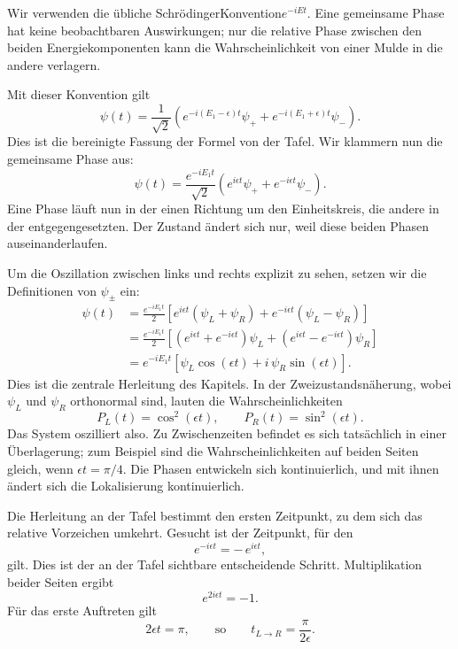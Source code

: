 Wir verwenden die übliche Schr\"odingerKonvention\(e^{-iEt}\). Eine gemeinsame Phase hat keine beobachtbaren Auswirkungen; nur die relative Phase zwischen den beiden Energiekomponenten kann die Wahrscheinlichkeit von einer Mulde in die andere verlagern.

Mit dieser Konvention gilt
\begin{equation}
\psi(t)=\frac{1}{\sqrt{2}}\left(e^{-i(E_1-\epsilon)t}\psi_+ + e^{-i(E_1+\epsilon)t}\psi_-\right).
\end{equation}
Dies ist die bereinigte Fassung der Formel von der Tafel. Wir klammern nun die gemeinsame Phase aus:
\begin{equation}
\psi(t)=\frac{e^{-iE_1 t}}{\sqrt{2}}\left(e^{i\epsilon t}\psi_+ + e^{-i\epsilon t}\psi_-\right).
\end{equation}
Eine Phase läuft nun in der einen Richtung um den Einheitskreis, die andere in der entgegengesetzten. Der Zustand ändert sich nur, weil diese beiden Phasen auseinanderlaufen.

Um die Oszillation zwischen links und rechts explizit zu sehen, setzen wir die Definitionen von \(\psi_\pm\) ein:
\begin{align}
\psi(t)
&= \frac{e^{-iE_1 t}}{2}
\left[e^{i\epsilon t}(\psi_L+\psi_R)+e^{-i\epsilon t}(\psi_L-\psi_R)\right] \\
&= \frac{e^{-iE_1 t}}{2}
\left[(e^{i\epsilon t}+e^{-i\epsilon t})\psi_L+(e^{i\epsilon t}-e^{-i\epsilon t})\psi_R\right] \\
&= e^{-iE_1 t}\left[\psi_L\cos(\epsilon t)+i\,\psi_R\sin(\epsilon t)\right].
\end{align}
Dies ist die zentrale Herleitung des Kapitels. In der Zweizustandsnäherung, wobei \(\psi_L\) und \(\psi_R\) orthonormal sind, lauten die Wahrscheinlichkeiten
\begin{equation}
P_L(t)=\cos^2(\epsilon t),
\qquad
P_R(t)=\sin^2(\epsilon t).
\end{equation}
Das System oszilliert also. Zu Zwischenzeiten befindet es sich tatsächlich in einer Überlagerung; zum Beispiel sind die Wahrscheinlichkeiten auf beiden Seiten gleich, wenn \(\epsilon t=\pi/4\). Die Phasen entwickeln sich kontinuierlich, und mit ihnen ändert sich die Lokalisierung kontinuierlich.

Die Herleitung an der Tafel bestimmt den ersten Zeitpunkt, zu dem sich das relative Vorzeichen umkehrt. Gesucht ist der Zeitpunkt, für den
\begin{equation}
e^{-i\epsilon t}=-\,e^{i\epsilon t},
\end{equation}
gilt. Dies ist der an der Tafel sichtbare entscheidende Schritt. Multiplikation beider Seiten ergibt
\begin{equation}
e^{2i\epsilon t}=-1.
\end{equation}
Für das erste Auftreten gilt
\begin{equation}
2\epsilon t=\pi,
\qquad\text{so}\qquad
t_{L\to R}=\frac{\pi}{2\epsilon}.
\end{equation}

